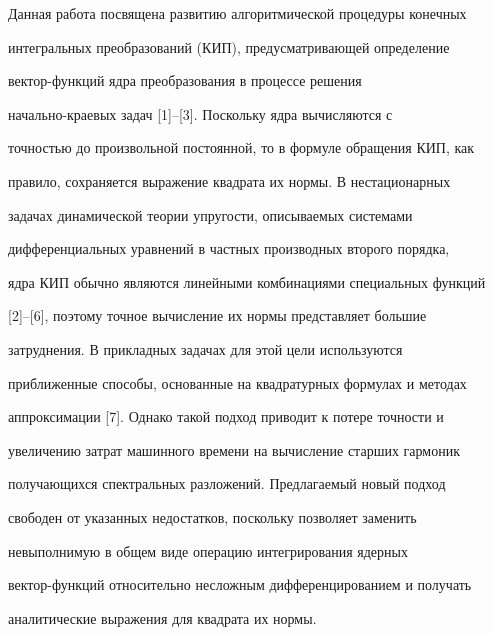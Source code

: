 \pagestyle{plain} %


 




\maketitle 


\label{begin} 


 


Данная работа посвящена развитию алгоритмической процедуры конечных 


интегральных преобразований (КИП), предусматривающей определение 


вектор-функций ядра преобразования в процессе решения 


начально-краевых задач [1]--[3]. Поскольку ядра вычисляются с 


точностью до произвольной постоянной, то в формуле обращения КИП, как 


правило, сохраняется выражение квадрата их нормы. В нестационарных 


задачах динамической теории упругости, описываемых системами 


дифференциальных уравнений в частных производных второго порядка, 


ядра КИП обычно являются линейными комбинациями специальных функций 


[2]--[6], поэтому точное вычисление их нормы представляет большие 


затруднения. В прикладных задачах для этой цели используются 


приближенные способы, основанные на квадратурных формулах и методах 


аппроксимации [7]. Однако такой подход приводит к потере точности и 


увеличению затрат машинного времени на вычисление старших гармоник 


получающихся спектральных разложений. Предлагаемый новый подход 


свободен от указанных недостатков, поскольку позволяет заменить 


невыполнимую в общем виде операцию интегрирования ядерных 


вектор-функций относительно несложным дифференцированием и получать 


аналитические выражения для квадрата их нормы. 


